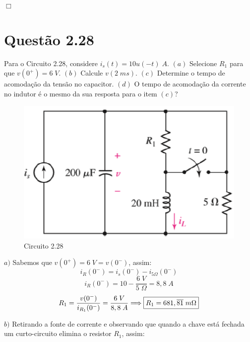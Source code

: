 \documentclass[
	12pt,				%
	oneside,			%
	a4paper,			%
	english,			%
	french,				%
	spanish,			%
	brazil				%
	]{abntex2}
\begin{document}
\begin{flushright}
    $\Box$
\end{flushright}
\newpage


\section*{Questão 2.28}
Para o Circuito 2.28, considere $i_s(t) = 10u(-t)\;A$. $(a)$ Selecione $R_1$ para que $v(0^+)=6\;V$. $(b)$ Calcule $v(2\;ms)$. $(c)$ Determine o tempo de acomodação da tensão no capacitor. $(d)$ O tempo de acomodação da corrente no indutor é o mesmo da sua resposta para o item $(c)$?
\begin{figure}[htb]
	\centering
	\includegraphics[scale=0.7]{2-28.PNG}
	\caption{Circuito 2.28}
\end{figure}

$a)$ Sabemos que $v(0^+) = 6\;V = v(0^-)$, assim:
$$i_R(0^-) = i_s(0^-) - i_{5\Omega}(0^-)$$
$$i_R(0^-) = 10 - \dfrac{6\;V}{5\;\Omega} = 8,8\;A$$
\begin{equation}
    \centering
    R_1 = \dfrac{v(0^-)}{i_{R_1}(0^-)} = \dfrac{6\;V}{8,8\;A} \Longrightarrow \fbox{$R_1 = 681,\overline{81}\;m\Omega$}
\end{equation}

$b)$ Retirando a fonte de corrente e observando que quando a chave está fechada um curto-circuito elimina o resistor $R_1$, assim:
\end{document}
